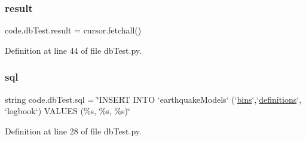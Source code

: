 \subsubsection{\texorpdfstring{result}{result}}
{\footnotesize\ttfamily code.\+db\+Test.\+result = cursor.\+fetchall()}



Definition at line 44 of file db\+Test.\+py.

\mbox{\label{namespacecode_1_1db_test_ae2262b4a4c2e113982780653f6b0767c}} 
\subsubsection{\texorpdfstring{sql}{sql}}
{\footnotesize\ttfamily string code.\+db\+Test.\+sql = \char`\"{}I\+N\+S\+E\+RT I\+N\+TO `earthquake\+Models` (`\hyperlink{namespacecode_1_1db_test_a561bd0a04a7558dbcf60255372f36535}{bins}`,`\hyperlink{namespacecode_1_1db_test_a18a56fcf49697eac62112214eac2cfc9}{definitions}`, `logbook`) V\+A\+L\+U\+ES (\%s, \%s, \%s)\char`\"{}}



Definition at line 28 of file db\+Test.\+py.

